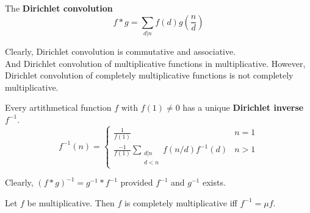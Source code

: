 \begin{definition}
	The \textbf{Dirichlet convolution}
	$$ f \ast g = \sum_{d|n} f(d)g\left(\frac{n}{d}\right)$$
\end{definition}
	Clearly, Dirichlet convolution is commutative and associative.\\
	And Dirichlet convolution of multiplicative functions in multiplicative. However, Dirichlet convolution of completely multiplicative functions is not completely multiplicative.
\begin{definition}
	Every artithmetical function $f$ with $f(1) \ne 0$ has a unique \textbf{Dirichlet inverse} $f^{-1}$.
	$$ f^{-1}(n) = \begin{cases} \frac{1}{f(1)} & n = 1 \\ \frac{-1}{f(1)} \displaystyle \sum_{\substack{d|n \\ d < n}} f(n/d)f^{-1}(d) & n > 1 \end{cases} $$
\end{definition}

	Clearly, $(f \ast g)^{-1} = g^{-1} \ast f^{-1}$ provided $f^{-1}$ and $g^{-1}$ exists.

\begin{theorem}
	Let $f$ be multiplicative.
	Then $f$ is completely multiplicative iff $f^{-1} = \mu f$.
\end{theorem}

